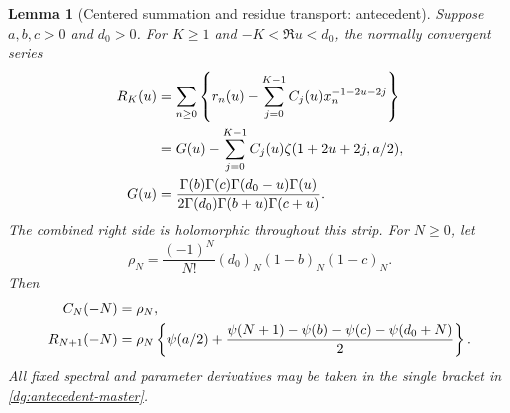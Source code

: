 \documentclass[11pt,a4paper]{article}
\numberwithin{equation}{section}
\newtheorem{lemma}[theorem]{Lemma}
\theoremstyle{definition}
\theoremstyle{remark}
\begin{document}
\begin{lemma}[Centered summation and residue transport: antecedent]
\label{dg:antecedent}
Suppose $a,b,c>0$ and $d_0>0$. For $K\geq1$ and
$-K<\Re u<d_0$, the normally convergent series
\begin{align}
 R_K(u)&=\sum_{n\geq0}\left\{r_n(u)-
       \sum_{j=0}^{K-1}C_j(u)x_n^{-1-2u-2j}\right\}\notag\\
 &=G(u)-\sum_{j=0}^{K-1}C_j(u)\zeta(1+2u+2j,a/2),\notag\\
 G(u)&=\frac{\Gamma(b)\Gamma(c)\Gamma(d_0-u)\Gamma(u)}
          {2\Gamma(d_0)\Gamma(b+u)\Gamma(c+u)}.
 \label{dg:antecedent-master}
\end{align}
The combined right side is holomorphic throughout this strip.
For $N\geq0$, let
\[
 \rho_N=\frac{(-1)^N}{N!}(d_0)_N(1-b)_N(1-c)_N.
\]
Then
\begin{align}
 C_N(-N)&=\rho_N,\notag\\
 R_{N+1}(-N)&=\rho_N\left\{\psi(a/2)+
 \frac{\psi(N+1)-\psi(b)-\psi(c)-\psi(d_0+N)}2\right\}.
 \label{dg:antecedent-closed}
\end{align}
All fixed spectral and parameter derivatives may be taken in the
single bracket in \eqref{dg:antecedent-master}.
\end{lemma}
\end{document}
